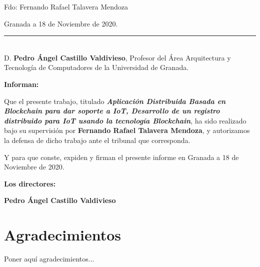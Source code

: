 \noindent Fdo: Fernando Rafael Talavera Mendoza

\vspace{2cm}

\begin{flushright}
Granada a 18 de Noviembre de 2020.
\end{flushright}
\clearpage


\newpage
\thispagestyle{empty}

\noindent\rule[-1ex]{\textwidth}{2pt}\\[4.5ex]

D. \textbf{Pedro Ángel Castillo Valdivieso}, Profesor del Área Arquitectura y Tecnología de Computadores de la Universidad de Granada.

\vspace{0.5cm}

\textbf{Informan:}

\vspace{0.5cm}

Que el presente trabajo, titulado \textit{\textbf{Aplicación Distribuida Basada en Blockchain para dar soporte a IoT, Desarrollo de un registro distribuido 
para IoT usando la tecnología Blockchain}}, ha sido realizado bajo su supervisión por \textbf{Fernando Rafael Talavera Mendoza}, y autorizamos la 
defensa de dicho trabajo ante el tribunal que corresponda.

\vspace{0.5cm}

Y para que conste, expiden y firman el presente informe en Granada a 18 de Noviembre de 2020.

\vspace{1cm}

\textbf{Los directores:}

\vspace{5cm}

\noindent \textbf{Pedro Ángel Castillo Valdivieso}

\newpage
\thispagestyle{empty}

\section*{Agradecimientos}
\thispagestyle{empty}
\vspace{1cm}


Poner aquí agradecimientos...

\myemptypage

